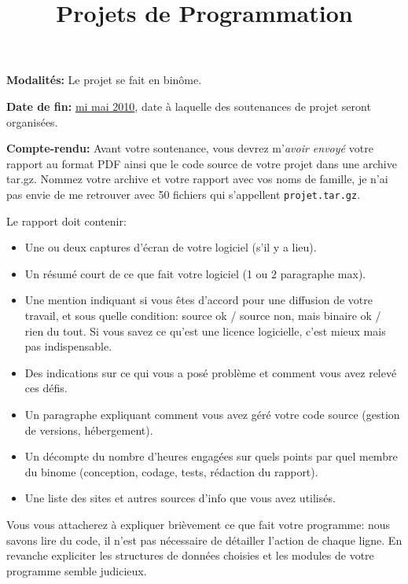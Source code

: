 \documentclass[10pt]{article}
\begin{document}
\title{Projets de Programmation}
\maketitle

\newcommand{\Para}[1]{\medskip\noindent\textbf{#1}}

\Para{Modalités:} Le projet se fait en binôme.

\Para{Date de fin:} \underline{mi mai 2010}, date à laquelle des
soutenances de projet seront organisées.

\Para{Compte-rendu:}
Avant votre soutenance, vous devrez m'\emph{avoir envoyé} votre rapport au format
PDF ainsi que le code source de votre projet dans une archive tar.gz.
Nommez votre archive et votre rapport avec vos noms de famille,
je n'ai pas envie de me retrouver avec 50 fichiers qui s'appellent {\tt projet.tar.gz}.

\bigskip

Le rapport doit contenir:

\begin{itemize}
\item Une ou deux captures d'écran de votre logiciel (s'il y a lieu).
\item Un résumé court de ce que fait votre logiciel (1 ou 2 paragraphe max).
\item Une mention indiquant si vous êtes d'accord pour une diffusion de
 votre travail, et sous quelle condition: source ok / source non, mais
 binaire ok / rien du tout. Si vous savez ce qu'est une licence
 logicielle, c'est mieux mais pas indispensable.
\item Des indications sur ce qui vous a posé problème et comment vous avez
 relevé ces défis.
\item Un paragraphe expliquant comment vous avez géré votre code source
     (gestion de versions, hébergement).
\item Un décompte du nombre d'heures engagées sur quels points par quel
 membre du binome (conception, codage, tests, rédaction du rapport).
\item Une liste des sites et autres sources d'info que vous avez utilisés.
\end{itemize}

Vous vous attacherez à expliquer brièvement ce que fait votre programme:
nous savons lire du code, il n'est pas nécessaire de détailler l'action de chaque ligne. En
revanche expliciter les structures de données choisies et les modules de votre
programme semble judicieux.
\end{document}
